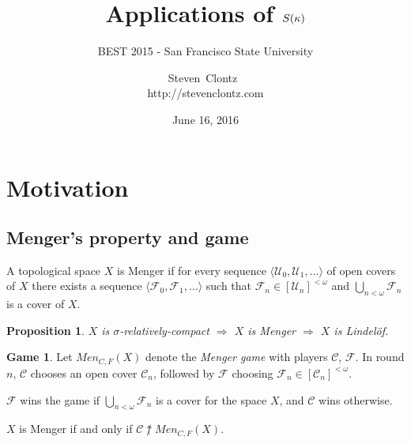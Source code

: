 \documentclass{beamer}
\title
{Applications of \(S(\kappa)\)}
\subtitle
{BEST 2015 - San Francisco State University} %
\author%
{Steven~Clontz~\\http://stevenclontz.com}%
\institute[Auburn, AL] %
{
  Auburn, AL}
\date[15-06-16] %
{June 16, 2016}
\newtheorem{proposition}[theorem]{Proposition}
\theoremstyle{definition}
\newtheorem{game}[theorem]{Game}
\newcommand{\win}{\uparrow}
\newcommand{\menGame}[1]{Men_{C,F}\left({#1}\right)}
\newcommand{\<}{\langle}
\renewcommand{\>}{\rangle}
\newcommand{\mc}[1]{\mathcal{#1}}
\newcommand{\pl}[1]{\mathscr{#1}}
\newcommand{\term}{\textit}
\begin{document}
\renewcommand{\pause}{}
\newcommand{\vpause}{\pause\vspace{1em}}

\begin{frame}
  \titlepage
\end{frame}

\section{Motivation}

\subsection{Menger's property and game}

\begin{frame}
  \begin{definition}
    A topological space \(X\) is Menger if for every sequence
    \(\<\mc U_0,\mc U_1,\dots\>\)
    of open covers of \(X\) there exists a sequence
    \(\<\mc F_0,\mc F_1,\dots\>\) such that
    \(\mc F_n\in [\mc U_n]^{<\omega}\)
    and \(\bigcup_{n<\omega}\mc F_n\) is a cover of \(X\).
  \end{definition}

  \pause

  \begin{proposition}
    \(X\) is \(\sigma\)-relatively-compact
      \(\Rightarrow\)
    \(X\) is Menger
      \(\Rightarrow\)
    \(X\) is Lindel\"of.
  \end{proposition}
\end{frame}

\begin{frame}
  \begin{game}
    Let \(\menGame{X}\) denote the \term{Menger game} with players
    \(\pl C\), \(\pl F\).
    In round \(n\), \(\pl C\) chooses an open cover \(\mc C_n\),
    followed by \(\pl F\) choosing \(\mc F_n\in[\mc C_n]^{<\omega}\).

    \(\pl F\) wins the game if
    \(\bigcup_{n<\omega}\mc F_n\) is a cover for the space
    \(X\), and \(\pl C\) wins otherwise.
  \end{game}

  \pause

  \begin{theorem}
    \(X\) is Menger if and only if \(\pl C \not\win \menGame X\).
  \end{theorem}
\end{frame}
\end{document}
